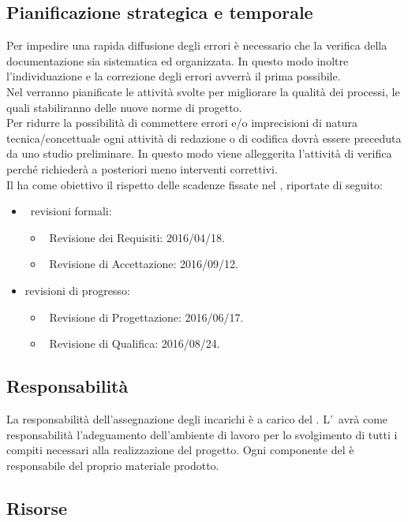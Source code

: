 	\subsection{Pianificazione strategica e temporale}
		Per impedire una rapida diffusione degli errori è necessario che la verifica della documentazione sia sistematica ed organizzata. In questo modo inoltre l'individuazione e la correzione degli errori avverrà il prima possibile. \\
		Nel \PPdoc verranno pianificate le attività svolte per migliorare la qualità dei processi, le quali stabiliranno delle nuove norme di progetto. \\
		Per ridurre la possibilità di commettere errori e/o imprecisioni di natura tecnica/concettuale ogni attività di redazione o di codifica dovrà essere preceduta da uno studio preliminare. In questo modo viene alleggerita l'attività di verifica perché richiederà a posteriori meno interventi correttivi. \\
		Il  ha come obiettivo il rispetto delle scadenze fissate nel \PPdoc, riportate di seguito:
		\begin{itemize}
			\item\ revisioni formali:
			\begin{itemize}
				\item\ Revisione dei Requisiti: 2016/04/18.
				\item\ Revisione di Accettazione: 2016/09/12.
			\end{itemize}
			\item revisioni di progresso:
			\begin{itemize}
				\item\ Revisione di Progettazione: 2016/06/17.
				\item\ Revisione di Qualifica: 2016/08/24.
			\end{itemize}
		\end{itemize}
	\subsection{Responsabilità}
		La responsabilità dell'assegnazione degli incarichi è a carico del \RES. L'\AM\ avrà come responsabilità l'adeguamento dell'ambiente di lavoro per lo svolgimento di tutti i compiti necessari alla realizzazione del progetto. Ogni componente del  è responsabile del proprio materiale prodotto.
	\subsection{Risorse}

